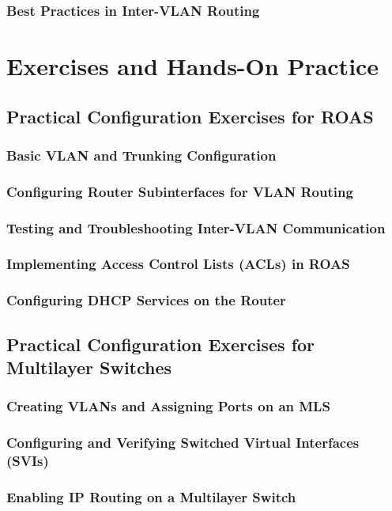 \documentclass[a4paper]{report}
\begin{document}
\section{Best Practices in Inter-VLAN Routing}

\part{Exercises and Hands-On Practice}

\chapter{Practical Configuration Exercises for ROAS}
\section{Basic VLAN and Trunking Configuration}
\section{Configuring Router Subinterfaces for VLAN Routing}
\section{Testing and Troubleshooting Inter-VLAN Communication}
\section{Implementing Access Control Lists (ACLs) in ROAS}
\section{Configuring DHCP Services on the Router}

\chapter{Practical Configuration Exercises for Multilayer Switches}
\section{Creating VLANs and Assigning Ports on an MLS}
\section{Configuring and Verifying Switched Virtual Interfaces (SVIs)}
\section{Enabling IP Routing on a Multilayer Switch}
\end{document}
